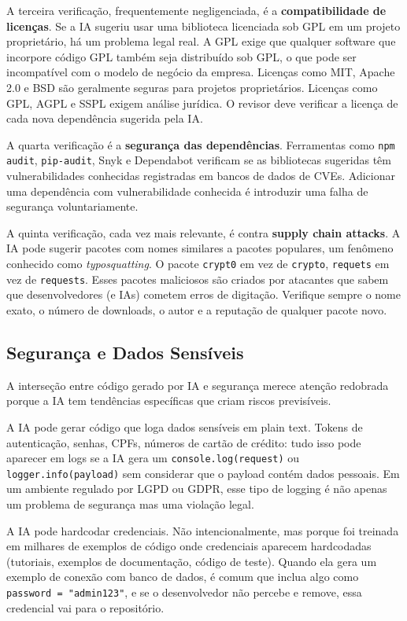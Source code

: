 A terceira verificação, frequentemente negligenciada, é a \textbf{compatibilidade de
licenças}. Se a IA sugeriu usar uma biblioteca licenciada sob GPL em um projeto
proprietário, há um problema legal real. A GPL exige que qualquer software que
incorpore código GPL também seja distribuído sob GPL, o que pode ser incompatível
com o modelo de negócio da empresa. Licenças como MIT, Apache 2.0 e BSD são geralmente
seguras para projetos proprietários. Licenças como GPL, AGPL e SSPL exigem análise
jurídica. O revisor deve verificar a licença de cada nova dependência sugerida pela IA.

A quarta verificação é a \textbf{segurança das dependências}. Ferramentas como
\texttt{npm audit}, \texttt{pip-audit}, Snyk e Dependabot verificam se as
bibliotecas sugeridas têm vulnerabilidades conhecidas registradas em bancos de dados
de CVEs. Adicionar uma dependência com vulnerabilidade conhecida é introduzir uma
falha de segurança voluntariamente.

A quinta verificação, cada vez mais relevante, é contra \textbf{supply chain attacks}.
A IA pode sugerir pacotes com nomes similares a pacotes populares, um fenômeno
conhecido como \textit{typosquatting}. O pacote \texttt{crypt0} em vez de
\texttt{crypto}, \texttt{requets} em vez de \texttt{requests}. Esses pacotes
maliciosos são criados por atacantes que sabem que desenvolvedores (e IAs) cometem
erros de digitação. Verifique sempre o nome exato, o número de downloads, o
autor e a reputação de qualquer pacote novo.

\subsection{Segurança e Dados Sensíveis}

A interseção entre código gerado por IA e segurança merece atenção redobrada porque
a IA tem tendências específicas que criam riscos previsíveis.

A IA pode gerar código que loga dados sensíveis em plain text. Tokens de
autenticação, senhas, CPFs, números de cartão de crédito: tudo isso pode aparecer
em logs se a IA gera um \texttt{console.log(request)} ou \texttt{logger.info(payload)}
sem considerar que o payload contém dados pessoais. Em um ambiente regulado por LGPD
ou GDPR, esse tipo de logging é não apenas um problema de segurança mas uma violação
legal.

A IA pode hardcodar credenciais. Não intencionalmente, mas porque foi treinada em
milhares de exemplos de código onde credenciais aparecem hardcodadas (tutoriais,
exemplos de documentação, código de teste). Quando ela gera um exemplo de conexão
com banco de dados, é comum que inclua algo como
\texttt{password = "admin123"}, e se o desenvolvedor não percebe e remove,
essa credencial vai para o repositório.

